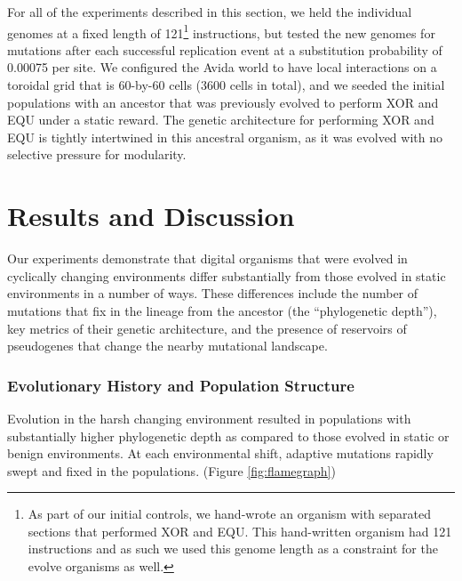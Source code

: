 \documentclass[letterpaper]{article}
\begin{document}
For all of the experiments described in this section, we held the individual genomes at a fixed length of 121\footnote{As part of
our initial controls, we hand-wrote an organism with separated sections that performed XOR and EQU. This hand-written organism had 121 instructions and as such we used this genome length as a constraint for the evolve organisms as well.
} instructions, but tested the new genomes for mutations
after each successful replication event at a substitution probability of 0.00075 per site.
We configured the Avida world to have local interactions on a toroidal grid that is 60-by-60 cells (3600 cells in total), and we seeded the initial populations with an ancestor that was previously evolved to perform XOR and EQU under a static reward.
The genetic architecture for performing XOR and EQU is tightly intertwined in this ancestral organism, as it was evolved with no selective pressure for modularity.

\section{Results and Discussion}

Our experiments demonstrate that digital organisms that were evolved in cyclically changing environments differ substantially from those evolved in static environments in a number of ways. These differences include the number of mutations that fix in the lineage from the ancestor (the ``phylogenetic depth''), key metrics of their genetic architecture, and the presence of reservoirs of pseudogenes that change the nearby mutational landscape.

\subsubsection{Evolutionary History and Population Structure}

Evolution in the harsh changing environment resulted in populations with substantially higher phylogenetic depth as compared to those evolved in static or benign environments. At each environmental shift, adaptive mutations rapidly swept and fixed in the populations. (Figure \ref{fig:flamegraph})
\end{document}
